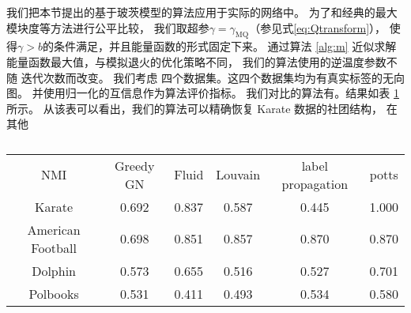 \documentclass{ctexart}
\begin{document}
\begin{table}
    我们把本节提出的基于玻茨模型的算法应用于实际的网络中。
    为了和经典的最大模块度等方法进行公平比较，
    我们取超参$\gamma=\gamma_{\mathrm{MQ}}$（参见式\eqref{eq:Qtransform}），
    使得$\gamma>b$的条件满足，并且能量函数的形式固定下来。
    通过算法 \ref{alg:m} 近似求解能量函数最大值，与模拟退火的优化策略不同，
    我们的算法使用的逆温度参数不随
    迭代次数而改变。
    我们考虑 四个数据集。这四个数据集均为有真实标签的无向图。
    并使用归一化的互信息\cite{Danon_2005}作为算法评价指标。
    我们对比的算法有。结果如表 \ref{tab:flatten_result} 所示。
    从该表可以看出，我们的算法可以精确恢复 Karate 数据的社团结构，
    在其他
    \begin{tabular}{cccccc}
    NMI               & Greedy GN & Fluid & Louvain  & label propagation & potts\\
    Karate            & 0.692     & 0.837 & 0.587   & 0.445         & 1.000     \\
    American Football & 0.698     & 0.851 & 0.857    & 0.870         & 0.870    \\
    Dolphin           & 0.573     & 0.655 & 0.516    & 0.527        & 0.701     \\
    Polbooks          & 0.531     & 0.411 & 0.493  & 0.534          & 0.580     
    \end{tabular}
    \caption{}\label{tab:flatten_result}
\end{table}



\end{document}
